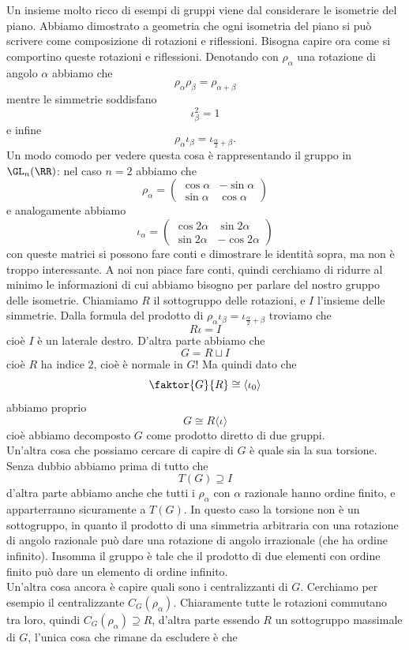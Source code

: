 \documentclass[11pt]{scrartcl}
\begin{document}
	Un insieme molto ricco di esempi di gruppi viene dal considerare le isometrie del piano. Abbiamo dimostrato a geometria che ogni isometria del piano si può scrivere come composizione di rotazioni e riflessioni. Bisogna capire ora come si comportino queste rotazioni e riflessioni. Denotando con $\rho_\alpha$ una rotazione di angolo $\alpha$ abbiamo che
	$$\rho_\alpha\rho_\beta=\rho_{\alpha+\beta}$$
	mentre le simmetrie soddisfano
	$$\iota_\beta^2=1$$
	e infine
	$$\rho_\alpha\iota_\beta=\iota_{\frac{\alpha}{2}+\beta}.$$
	Un modo comodo per vedere questa cosa è rappresentando il gruppo in $\GL_n(\RR)$: nel caso $n=2$ abbiamo che
	$$
	\rho_\alpha=\begin{pmatrix}
		\cos \alpha & -\sin\alpha \\
		\sin\alpha & \cos\alpha
	\end{pmatrix}
	$$
	e analogamente abbiamo
	$$
	\iota_\alpha=\begin{pmatrix}
		\cos 2\alpha & \sin 2\alpha \\
		\sin 2\alpha & -\cos 2\alpha
	\end{pmatrix}
	$$
	con queste matrici si possono fare conti e dimostrare le identità sopra, ma non è troppo interessante. A noi non piace fare conti, quindi cerchiamo di ridurre al minimo le informazioni di cui abbiamo bisogno per parlare del nostro gruppo delle isometrie. Chiamiamo $R$ il sottogruppo delle rotazioni, e $I$ l'insieme delle simmetrie. Dalla formula del prodotto di $\rho_\alpha\iota_\beta=\iota_{\frac{\alpha}{2}+\beta}$ troviamo che 
	$$R\iota=I$$
	cioè $I$ è un laterale destro. D'altra parte abbiamo che
	$$G=R\sqcup I$$
	cioè $R$ ha indice $2$, cioè è normale in $G$! Ma quindi dato che
	$$\faktor{G}{R}\cong \langle \iota_0\rangle$$
	abbiamo proprio
	$$G\cong R\langle \iota\rangle$$
	cioè abbiamo decomposto $G$ come prodotto diretto di due gruppi. \\
	Un'altra cosa che possiamo cercare di capire di $G$ è quale sia la sua torsione. Senza dubbio abbiamo prima di tutto che
	$$T(G)\supseteq I$$
	d'altra parte abbiamo anche che tutti i $\rho_\alpha$ con $\alpha$ razionale hanno ordine finito, e apparterranno sicuramente a $T(G)$. In questo caso la torsione non è un sottogruppo, in quanto il prodotto di una simmetria arbitraria con una rotazione di angolo razionale può dare una rotazione di angolo irrazionale (che ha ordine infinito). Insomma il gruppo è tale che il prodotto di due elementi con ordine finito può dare un elemento di ordine infinito. \\
	Un'altra cosa ancora è capire quali sono i centralizzanti di $G$. Cerchiamo per esempio il centralizzante $C_G(\rho_\alpha)$. Chiaramente tutte le rotazioni commutano tra loro, quindi $C_G(\rho_\alpha)\supseteq R$, d'altra parte essendo $R$ un sottogruppo massimale di $G$, l'unica cosa che rimane da escludere è che 
\end{document}
